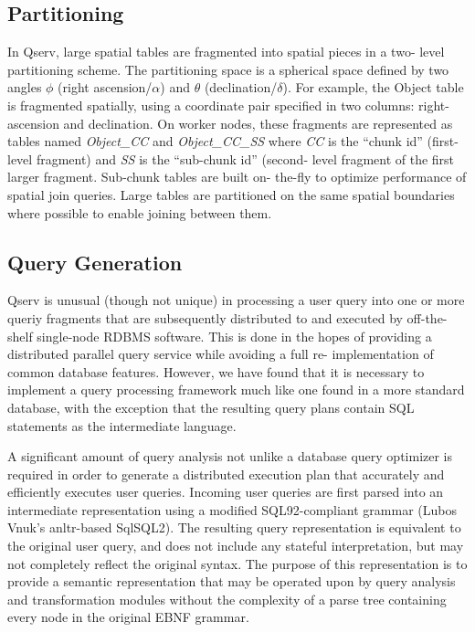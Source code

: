 \documentclass[DM,lsstdraft,toc]{lsstdoc}
\begin{document}
\subsection{Partitioning}\label{partitioning-1}

In Qserv, large spatial tables are fragmented into spatial pieces in a two-
level partitioning scheme. The partitioning space is a spherical space defined
by two angles $\phi$ (right ascension/$\alpha$) and $\theta$
(declination/$\delta$). For example, the Object table is fragmented spatially,
using a coordinate pair specified in two columns: right-ascension and
declination. On worker nodes, these fragments are represented as tables named
\emph{Object\_CC} and \emph{Object\_CC\_SS} where \emph{CC} is the ``chunk
id'' (first-level fragment) and \emph{SS} is the ``sub-chunk id'' (second-
level fragment of the first larger fragment. Sub-chunk tables are built on-
the-fly to optimize performance of spatial join queries. Large tables are
partitioned on the same spatial boundaries where possible to enable joining
between them.

\subsection{Query Generation}\label{query-generation}

Qserv is unusual (though not unique) in processing a user query into one or
more queriy fragments that are subsequently distributed to and executed by
off-the-shelf single-node RDBMS software. This is done in the hopes of
providing a distributed parallel query service while avoiding a full re-
implementation of common database features. However, we have found that it is
necessary to implement a query processing framework much like one found in a
more standard database, with the exception that the resulting query plans
contain SQL statements as the intermediate language.

A significant amount of query analysis not unlike a database query optimizer
is required in order to generate a distributed execution plan that accurately
and efficiently executes user queries. Incoming user queries are first parsed
into an intermediate representation using a modified SQL92-compliant grammar
(Lubos Vnuk's anltr-based SqlSQL2). The resulting query representation is
equivalent to the original user query, and does not include any stateful
interpretation, but may not completely reflect the original syntax. The
purpose of this representation is to provide a semantic representation that
may be operated upon by query analysis and transformation modules without the
complexity of a parse tree containing every node in the original EBNF grammar.
\end{document}

